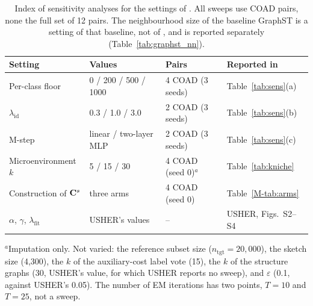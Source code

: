 \begin{table}[htbp]
\centering
\caption{Index of sensitivity analyses for the settings of \frost. All sweeps use COAD pairs, none the full set of 12
pairs. The neighbourhood size of the baseline GraphST is a setting of that baseline, not of \frost, and is reported
separately (Table~\ref{tab:graphst_nn}).}
\label{tab:sensidx}
\begin{tabular}{@{}llll@{}}
\toprule
Setting & Values & Pairs & Reported in \\
\midrule
Per-class floor & 0 / 200 / 500 / 1000 & 4 COAD (3 seeds) & Table~\ref{tab:sens}(a) \\
$\lambda_{\mathrm{id}}$ & 0.3 / 1.0 / 3.0 & 2 COAD (3 seeds) & Table~\ref{tab:sens}(b) \\
M-step & linear / two-layer MLP & 2 COAD (3 seeds) & Table~\ref{tab:sens}(c) \\
Microenvironment $k$ & 5 / 15 / 30 & 4 COAD (seed 0)$^{a}$ & Table~\ref{tab:kniche} \\
Construction of $\mathbf{C}^{s}$ & three arms & 4 COAD (seed 0) & Table~\ref{M-tab:arms} \\
$\alpha$, $\gamma$, $\lambda_{\mathrm{fit}}$ & USHER's values & -- & USHER, Figs.~S2--S4~\citep{pratapa2025usher} \\
\bottomrule
\end{tabular}

\smallskip
\raggedright
$^{a}$Imputation only. Not varied: the reference subset size ($n_{\mathrm{tgt}}=20{,}000$), the sketch size (4{,}300), the $k$ of the
auxiliary-cost label vote (15), the $k$ of the structure graphs (30, USHER's value, for which USHER reports no
sweep), and $\varepsilon$ (0.1, against USHER's 0.05). The number of EM iterations has two points, $T=10$ and $T=25$,
not a sweep.
\end{table}

